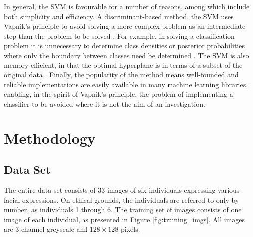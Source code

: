 In general, the SVM is favourable for a number of reasons, among which include both simplicity and efficiency. A discriminant-based method, the SVM uses Vapnik's principle to avoid solving a more complex problem as an intermediate step than the problem to be solved \cite{alpaydin_2020}. For example, in solving a classification problem it is unnecessary to determine class densities or posterior probabilities where only the boundary between classes need be determined \cite{alpaydin_2020}. The SVM is also memory efficient, in that the optimal hyperplane is in terms of a subset of the original data \cite{alpaydin_2020}. Finally, the popularity of the method means well-founded and reliable implementations are easily available in many machine learning libraries, enabling, in the spirit of Vapnik's principle, the problem of implementing a classifier to be avoided where it is not the aim of an investigation.

\newpage
\section{Methodology}
\subsection{Data Set}

The entire data set consists of 33 images of six individuals expressing various facial expressions. On ethical grounds, the individuals are referred to only by number, as individuals 1 through 6. The training set of images consists of one image of each individual, as presented in Figure \ref{fig:training_imgs}. All images are 3-channel greyscale and $128\times128$ pixels.

